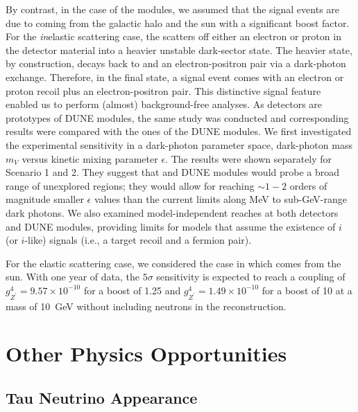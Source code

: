 By contrast, in the case of the  modules, we assumed that the signal events are due to  coming from the galactic halo and the sun with a significant boost factor. 
For the \textit{in}elastic scattering case, the  scatters off either an electron or proton in the detector material into a heavier unstable dark-sector state.
The heavier state, by construction, decays back to  and an electron-positron pair via a dark-photon exchange. 
Therefore, in the final state, a signal event comes with an electron or proton recoil plus an electron-positron pair. 
This distinctive signal feature enabled us to perform (almost) background-free analyses. 
As  detectors are prototypes of DUNE  modules, the same study was conducted and corresponding results were compared with the ones of the DUNE  modules.  
We first investigated the experimental sensitivity in a dark-photon parameter space, dark-photon mass $m_V$ versus kinetic mixing parameter $\epsilon$. 
The results were shown separately for Scenario 1 and 2. 
They suggest that  and DUNE  modules would probe a broad range of unexplored regions; they would allow for reaching $\sim 1-2$ orders of magnitude smaller $\epsilon$ values than the current limits along MeV to sub-GeV-range dark photons. 
We also examined model-independent reaches at both  detectors and DUNE  modules, providing limits for models that assume the existence of $i$ (or $i$-like) signals (i.e., a target recoil and a fermion pair). 

For the elastic scattering case, we considered the case in which  comes from the sun. 
With one year of data, the $5\sigma$ sensitivity is expected to reach a coupling of $g_{Z^\prime}^4 = 9.57 \times 10^{-10}$ for a boost of 1.25 and $g_{Z^\prime}^4 = 1.49 \times 10^{-10}$ for a boost of 10 at a  mass of \SI{10}{GeV} without including neutrons in the reconstruction.



\section{Other  Physics Opportunities}
\label{sec:otheropps}

\subsection{Tau Neutrino Appearance} 

